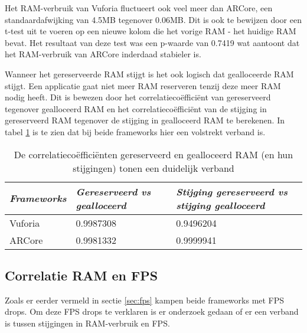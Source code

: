 Het RAM-verbruik van Vuforia fluctueert ook veel meer dan ARCore, een standaardafwijking van 4.5MB tegenover 0.06MB. Dit is ook te bewijzen door een t-test uit te voeren op een nieuwe kolom die het vorige RAM - het huidige RAM bevat. Het resultaat van deze test was een p-waarde van 0.7419 wat aantoont dat het RAM-verbruik van ARCore inderdaad stabieler is.

Wanneer het gereserveerde RAM stijgt is het ook logisch dat gealloceerde RAM stijgt. Een applicatie gaat niet meer RAM reserveren tenzij deze meer RAM nodig heeft. Dit is bewezen door het correlatiecoëfficiënt van gereserveerd tegenover gealloceerd RAM en het correlatiecoëfficiënt van de stijging in gereserveerd RAM tegenover de stijging in gealloceerd RAM te berekenen. In tabel \ref{tbl:ramcor} is te zien dat bij beide frameworks hier een volstrekt verband is.

\begin{table}
    \centering
    \begin{tabular}{lll} \toprule
       \textit{Frameworks} &  \textit{Gereserveerd vs gealloceerd} &  \textit{Stijging gereserveerd   vs stijging gealloceerd} \\ \midrule
        Vuforia & 0.9987308                          & 0.9496204                                            \\ 
        ARCore  & 0.9981332                          & 0.9999941                                           \\ \bottomrule
    \end{tabular}
 \caption{De correlatiecoëfficiënten gereserveerd en gealloceerd RAM (en hun stijgingen) tonen een duidelijk verband}\label{tbl:ramcor}
\end{table}

\subsection{Correlatie RAM en FPS}
Zoals er eerder vermeld in sectie \ref{sec:fps} kampen beide frameworks met FPS drops. Om deze FPS drops te verklaren is er onderzoek gedaan of er een verband is tussen stijgingen in RAM-verbruik en FPS.

